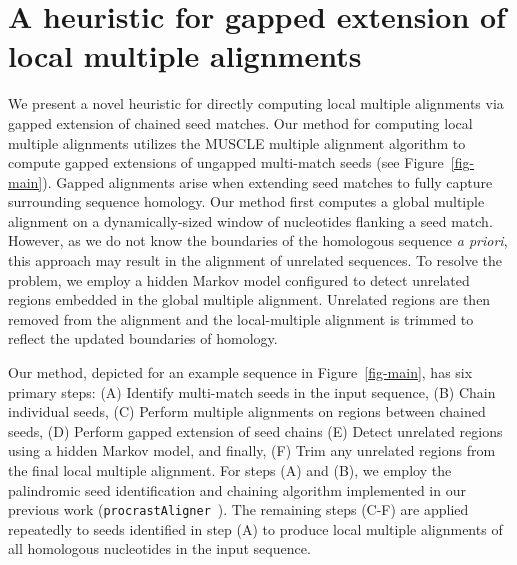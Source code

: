 \documentclass[9.5pt,journal,final,finalsubmission,twocolumn]{IEEEtran}
\begin{document}
\section{A heuristic for gapped extension of local multiple alignments}
We present a novel heuristic for directly computing local multiple alignments via gapped extension of chained seed matches. Our method for computing local multiple alignments utilizes the MUSCLE
multiple alignment algorithm to compute gapped extensions of ungapped
multi-match seeds (see Figure~\ref{fig-main}). Gapped alignments arise
when extending seed matches to fully capture surrounding sequence
homology. Our method first computes a
global multiple alignment on a dynamically-sized window of nucleotides
flanking a seed match.  However, as we do not know the boundaries of the
homologous sequence \textit{a priori}, this approach may result in the
alignment of unrelated sequences.  To resolve the problem, we employ a hidden Markov model configured to detect
unrelated regions embedded in the global multiple alignment.
Unrelated regions are then removed from the alignment and the
local-multiple alignment is trimmed to reflect the updated boundaries
of homology.

Our method, depicted for an example sequence in
Figure~\ref{fig-main}, has six primary steps: (A) Identify
multi-match seeds in the input sequence, (B) Chain individual
seeds, (C) Perform multiple alignments on regions between chained seeds, (D)
Perform gapped extension of seed chains (E) Detect unrelated regions
using a hidden Markov model, and finally, (F) Trim any unrelated regions from
the final local multiple alignment. For steps (A) and (B), we employ the palindromic seed identification
and chaining algorithm implemented in our previous work (\texttt{procrastAligner}~\cite{ref-procrast}). The remaining steps (C-F) are applied
repeatedly to seeds identified in step (A) to produce local multiple
alignments of all homologous nucleotides in the input sequence.
\end{document}
